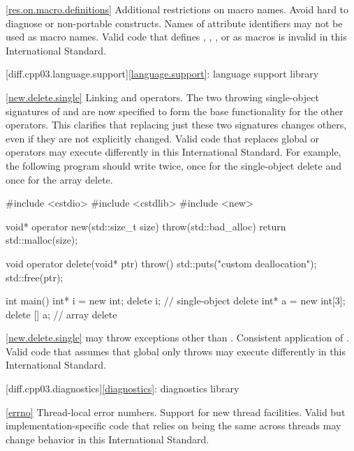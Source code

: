 \ref{res.on.macro.definitions}
\change Additional restrictions on macro names.
\rationale Avoid hard to diagnose or non-portable constructs.
\effect
Names of attribute identifiers may not be used as macro names. Valid \CppIII
code that defines , ,
, or  as macros is invalid in this
International Standard.

[diff.cpp03.language.support]{\ref{language.support}:
language support library}

\ref{new.delete.single}
\change Linking  and  operators.
\rationale The two throwing single-object signatures of  and
 are now specified to form the base functionality for
the other operators. This clarifies that replacing just these two signatures
changes others, even if they are not explicitly changed.
\effect
Valid \CppIII code that replaces global  or 
operators may execute differently in this International Standard. For
example, the following program should write  twice,
once for the single-object delete and once for the array delete.

\begin{codeblock}
#include <cstdio>
#include <cstdlib>
#include <new>

void* operator new(std::size_t size) throw(std::bad_alloc) {
  return std::malloc(size);
}

void operator delete(void* ptr) throw() {
  std::puts("custom deallocation");
  std::free(ptr);
}

int main() {
  int* i = new int;
  delete i;                     // single-object delete
  int* a = new int[3];
  delete [] a;                  // array delete
}
\end{codeblock}

\ref{new.delete.single}
\change {} may throw exceptions other than
.
\rationale Consistent application of .
\effect
Valid \CppIII code that assumes that global  only
throws  may execute differently in this International
Standard.

[diff.cpp03.diagnostics]{\ref{diagnostics}: diagnostics library}

\ref{errno}
\change Thread-local error numbers.
\rationale Support for new thread facilities.
\effect Valid but implementation-specific \CppIII code that relies on
 being the same across threads may change behavior in this
International Standard.

